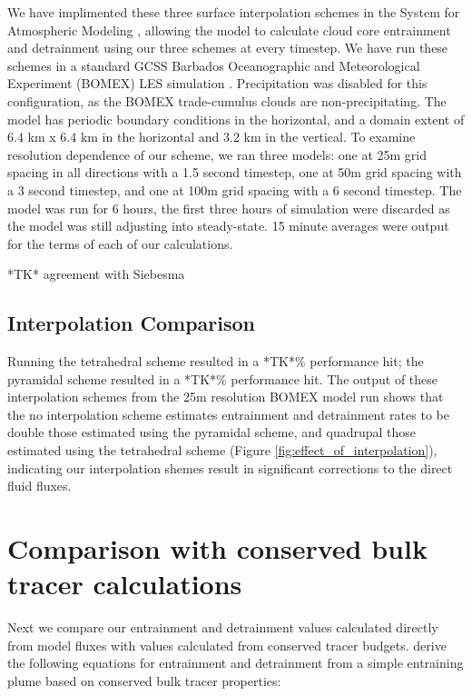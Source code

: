 \documentclass[12pt]{article}
\begin{document}
We have implimented these three surface interpolation schemes in the System for 
Atmospheric Modeling \citep[SAM;][]{Khairoutdinov2003}, allowing the model to 
calculate cloud core entrainment and detrainment using our three schemes at 
every timestep.  We have run these schemes in a standard GCSS Barbados 
Oceanographic and Meteorological Experiment (BOMEX) LES simulation 
\citep{Holland1973, Siebesma2003}.  Precipitation was disabled for this 
configuration, as the BOMEX trade-cumulus clouds are non-precipitating.  The 
model has periodic boundary conditions in the horizontal, and a domain extent 
of 6.4 km x 6.4 km in the horizontal and 3.2 km in the vertical.  To examine 
resolution dependence of our scheme, we ran three models: one at 25m grid 
spacing in all directions with a 1.5 second timestep, one at 50m grid spacing 
with a 3 second timestep, and one at 100m grid spacing with a 6 second 
timestep.  The model was run for 6 hours, the first three hours of simulation 
were discarded as the model was still adjusting into steady-state.  15 minute 
averages were output for the terms of each of our calculations.

*TK* agreement with Siebesma

\subsection{Interpolation Comparison}

Running the tetrahedral scheme resulted in a *TK*\% performance hit; the 
pyramidal scheme resulted in a *TK*\% performance hit.  The output of these 
interpolation schemes from the 25m resolution BOMEX model run shows that the 
no interpolation scheme estimates entrainment and detrainment rates to be 
double those estimated using the pyramidal scheme, and quadrupal those 
estimated using the tetrahedral scheme (Figure 
\ref{fig:effect_of_interpolation}), indicating our interpolation shemes result 
in significant corrections to the direct fluid fluxes.


\section{Comparison with conserved bulk tracer calculations}

Next we compare our entrainment and detrainment values calculated directly from 
model fluxes with values calculated from conserved tracer budgets.  
\cite{Siebesma1995} derive the following equations for entrainment and 
detrainment from a simple entraining plume based on conserved bulk tracer 
properties:
\end{document}
